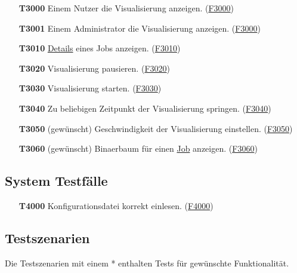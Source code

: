 \begin{itemize}
    \item[\textbf{T3000}] Einem \gls{Nutzer} die Visualisierung anzeigen. (\hyperref[FA:Visualisierung:Anzeigen des Systemzustandes]{F3000})
    
    \item[\textbf{T3001}] Einem \gls{Administrator} die Visualisierung anzeigen. (\hyperref[FA:Visualisierung:Anzeigen des Systemzustandes]{F3000})
    
    \item[\textbf{T3010}] \hyperref[B:Job-Details]{Details} eines Jobs anzeigen. (\hyperref[FA:Visualisierung:Anzeigen von Details]{F3010})
    
    \item[\textbf{T3020}] Visualisierung pausieren. (\hyperref[FA:Visualisierung:Pausieren der Visualisierung]{F3020})
    
    \item[\textbf{T3030}] Visualisierung starten. (\hyperref[FA:Visualisierung:Starten der Visualisierung]{F3030})
    
    \item[\textbf{T3040}] Zu beliebigen Zeitpunkt der Visualisierung springen. (\hyperref[FA:Visualisierung:Springen]{F3040})
    
    \item[\textbf{T3050}] (gewünscht) Geschwindigkeit der Visualisierung einstellen. (\hyperref[FA:Visualisierung:Aendern der Wiedergabegeschwindigkeit]{F3050})
    
    \item[\textbf{T3060}] (gewünscht) \gls{Binaerbaum} für einen \hyperref[B:Jobs]{Job} anzeigen. (\hyperref[FA:Visualisierung:Anzeigen des Binaerbaumes für einen Job]{F3060})
    
\end{itemize}

\subsection{System Testfälle}

\begin{itemize}
    \item[\textbf{T4000}] Konfigurationsdatei korrekt einlesen. (\hyperref[FA:System:Einstellungen festlegen]{F4000})
    

\end{itemize}

\subsection{Testszenarien}
Die Testszenarien mit einem * enthalten Tests für gewünschte Funktionalität.

